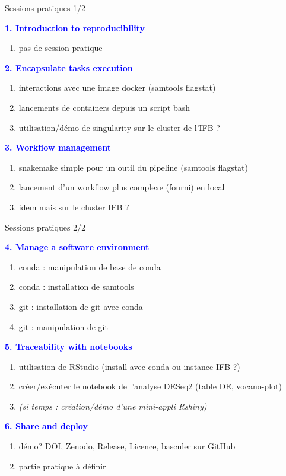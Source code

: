 \documentclass{beamer}
\begin{document}
\begin{frame}{Sessions pratiques 1/2}
\begin{center}
{\bf \textcolor{blue}{1. Introduction to reproducibility}}
\begin{enumerate}
    \item pas de session pratique
\end{enumerate}
\end{center}
\begin{center}
{\bf \textcolor{blue}{2. Encapsulate tasks execution}}
\begin{enumerate}
    \item interactions avec une image docker (samtools flagstat)
    \item lancements de containers depuis un script bash
    \item utilisation/démo de singularity sur le cluster de l'IFB ?
\end{enumerate}
{\bf \textcolor{blue}{3. Workflow management}}
\begin{enumerate}
    \item snakemake simple pour un outil du pipeline (samtools flagstat)
    \item lancement d'un workflow plus complexe (fourni) en local
    \item idem mais sur le cluster IFB ?
\end{enumerate}
\end{center}
\end{frame}
\begin{frame}{Sessions pratiques 2/2}
\begin{center}
{\bf \textcolor{blue}{4. Manage a software environment}}
\begin{enumerate}
    \item conda : manipulation de base de conda
    \item conda : installation de samtools
    \item git : installation de git avec conda
    \item git : manipulation de git
\end{enumerate}
{\bf \textcolor{blue}{5. Traceability with notebooks}}
\begin{enumerate}
    \item utilisation de RStudio (install avec conda ou instance IFB ?)
    \item créer/exécuter le notebook de l'analyse DESeq2 (table DE, vocano-plot)
    \item {\it (si temps : création/démo d'une mini-appli Rshiny)}
\end{enumerate}
{\bf \textcolor{blue}{6. Share and deploy}}
\begin{enumerate}
    \item démo? DOI, Zenodo, Release, Licence, basculer sur GitHub
    \item partie pratique à définir
\end{enumerate}
\end{center}
\end{frame}
\end{document}
